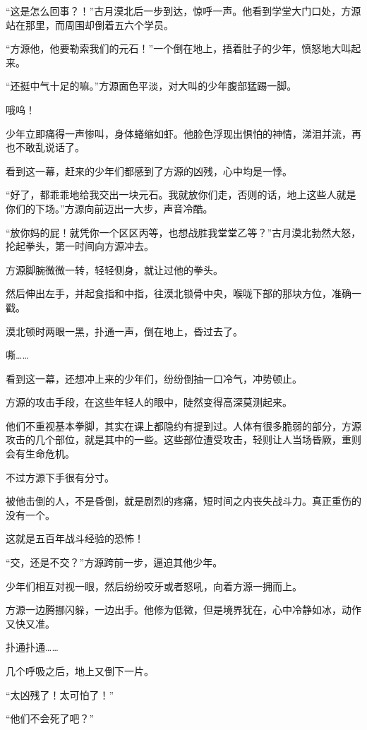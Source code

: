 \begin{this_body}
“这是怎么回事？！”古月漠北后一步到达，惊呼一声。他看到学堂大门口处，方源站在那里，而周围却倒着五六个学员。

“方源他，他要勒索我们的元石！”一个倒在地上，捂着肚子的少年，愤怒地大叫起来。

“还挺中气十足的嘛。”方源面色平淡，对大叫的少年腹部猛踢一脚。

哦呜！

少年立即痛得一声惨叫，身体蜷缩如虾。他脸色浮现出惧怕的神情，涕泪并流，再也不敢乱说话了。

看到这一幕，赶来的少年们都感到了方源的凶残，心中均是一悸。

“好了，都乖乖地给我交出一块元石。我就放你们走，否则的话，地上这些人就是你们的下场。”方源向前迈出一大步，声音冷酷。

“放你妈的屁！就凭你一个区区丙等，也想战胜我堂堂乙等？”古月漠北勃然大怒，抡起拳头，第一时间向方源冲去。

方源脚腕微微一转，轻轻侧身，就让过他的拳头。

然后伸出左手，并起食指和中指，往漠北锁骨中央，喉咙下部的那块方位，准确一戳。

漠北顿时两眼一黑，扑通一声，倒在地上，昏过去了。

嘶……

看到这一幕，还想冲上来的少年们，纷纷倒抽一口冷气，冲势顿止。

方源的攻击手段，在这些年轻人的眼中，陡然变得高深莫测起来。

他们不重视基本拳脚，其实在课上都隐约有提到过。人体有很多脆弱的部分，方源攻击的几个部位，就是其中的一些。这些部位遭受攻击，轻则让人当场昏厥，重则会有生命危机。

不过方源下手很有分寸。

被他击倒的人，不是昏倒，就是剧烈的疼痛，短时间之内丧失战斗力。真正重伤的没有一个。

这就是五百年战斗经验的恐怖！

“交，还是不交？”方源跨前一步，逼迫其他少年。

少年们相互对视一眼，然后纷纷咬牙或者怒吼，向着方源一拥而上。

方源一边腾挪闪躲，一边出手。他修为低微，但是境界犹在，心中冷静如冰，动作又快又准。

扑通扑通……

几个呼吸之后，地上又倒下一片。

“太凶残了！太可怕了！”

“他们不会死了吧？”


\end{this_body}
